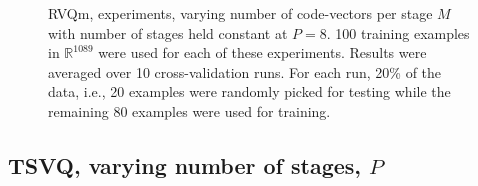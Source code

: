 \begin{figure}[h]
\caption{RVQm, experiments, varying number of code-vectors per stage $M$ with number of stages held constant at $P=8$. 100 training examples in $\mathbb{R}^{1089}$ were used for each of these experiments. Results were averaged over 10 cross-validation runs. For each run, 20\% of the data, i.e., 20 examples were randomly picked for testing while the remaining 80 examples were used for training.}
\label{fig:RVQ_results_varyingM}
\end{figure}
\newpage
\subsection{TSVQ, varying number of stages, $P$}
\begin{figure}[h]
\hspace{0.55in}

\end{figure}
